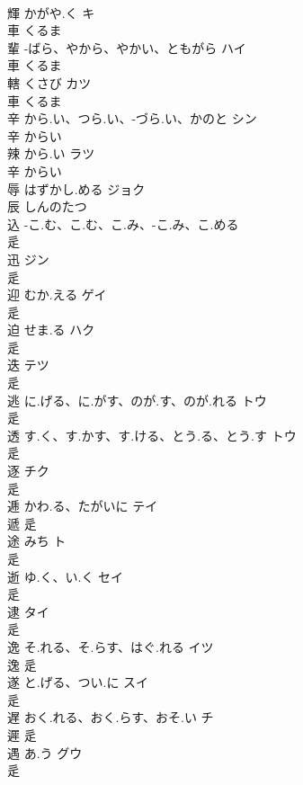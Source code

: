 \documentclass[8pt]{extreport}
\begin{document}
\begin{CJK}{UTF8}{min}
\\	輝	かがや.く	キ	
\\	車		くるま		
\\	輩	-ばら、やから、やかい、ともがら	ハイ	
\\	車		くるま		
\\	轄	くさび	カツ	
\\	車		くるま		
\\	辛	から.い、つら.い、-づら.い、かのと	シン	
\\	辛		からい		
\\	辣	から.い	ラツ	
\\	辛		からい		
\\	辱	はずかし.める	ジョク	
\\	辰		しんのたつ		
\\	込	-こ.む、こ.む、こ.み、-こ.み、こ.める		
\\	辵				
\\	迅		ジン	
\\	辵				
\\	迎	むか.える	ゲイ	
\\	辵				
\\	迫	せま.る	ハク	
\\	辵				
\\	迭		テツ	
\\	辵				
\\	逃	に.げる、に.がす、のが.す、のが.れる	トウ	
\\	辵				
\\	透	す.く、す.かす、す.ける、とう.る、とう.す	トウ	
\\	辵				
\\	逐		チク	
\\	辵				
\\	逓	かわ.る、たがいに	テイ	
\\	遞	辵				
\\	途	みち	ト	
\\	辵				
\\	逝	ゆ.く、い.く	セイ	
\\	辵				
\\	逮		タイ	
\\	辵				
\\	逸	そ.れる、そ.らす、はぐ.れる	イツ	
\\	逸	辵				
\\	遂	と.げる、つい.に	スイ	
\\	辵				
\\	遅	おく.れる、おく.らす、おそ.い	チ	
\\	遲	辵				
\\	遇	あ.う	グウ	
\\	辵				

\end{CJK}
\end{document}
